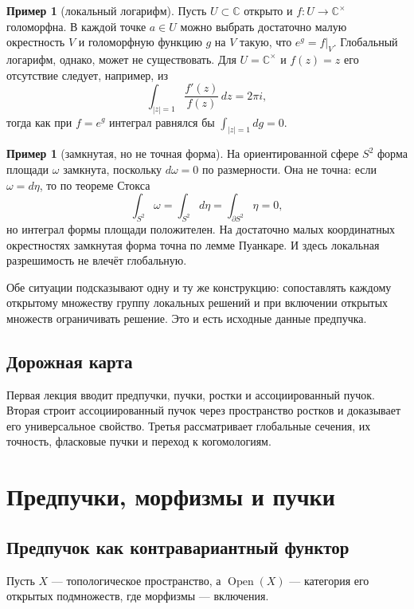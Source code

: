 \documentclass[11pt,b5paper,oneside]{article}
\newcommand{\C}{\mathbb C}
\theoremstyle{plain}
\theoremstyle{definition}
\newtheorem{exm}[thm]{Пример}
\theoremstyle{remark}
\begin{document}
\begin{exm}[локальный логарифм]
Пусть $U\subset\C$ открыто и $f:U\to\C^\times$ голоморфна.
В каждой точке $a\in U$ можно выбрать достаточно малую окрестность $V$
и голоморфную функцию $g$ на $V$ такую, что $e^g=f|_V$. Глобальный
логарифм, однако, может не существовать. Для $U=\C^\times$ и $f(z)=z$
его отсутствие следует, например, из
\[
  \int_{|z|=1}\frac{f'(z)}{f(z)}\,dz=2\pi i,
\]
тогда как при $f=e^g$ интеграл равнялся бы $\int_{|z|=1}dg=0$.
\end{exm}

\begin{exm}[замкнутая, но не точная форма]
На ориентированной сфере $S^2$ форма площади $\omega$ замкнута, поскольку
$d\omega=0$ по размерности. Она не точна: если $\omega=d\eta$, то по
теореме Стокса
\[
  \int_{S^2}\omega=\int_{S^2}d\eta=\int_{\partial S^2}\eta=0,
\]
но интеграл формы площади положителен. На достаточно малых координатных
окрестностях замкнутая форма точна по лемме Пуанкаре. И здесь локальная
разрешимость не влечёт глобальную.
\end{exm}

Обе ситуации подсказывают одну и ту же конструкцию: сопоставлять каждому
открытому множеству группу локальных решений и при включении открытых
множеств ограничивать решение. Это и есть исходные данные предпучка.

\subsection{Дорожная карта}
Первая лекция вводит предпучки, пучки, ростки и ассоциированный пучок.
Вторая строит ассоциированный пучок через пространство ростков и
доказывает его универсальное свойство. Третья рассматривает глобальные
сечения, их точность, фласковые пучки и переход к когомологиям.

\section{Предпучки, морфизмы и пучки}

\subsection{Предпучок как контравариантный функтор}
Пусть $X$ --- топологическое пространство, а $\operatorname{Open}(X)$ ---
категория его открытых подмножеств, где морфизмы --- включения.
\end{document}
